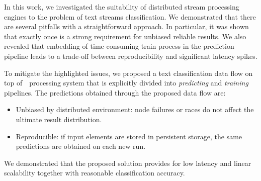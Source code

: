 \label {fs-short-conclusion}

In this work, we investigated the suitability of distributed stream processing engines to the problem of text streams classification. We demonstrated that there are several pitfalls with a straightforward approach. In particular, it was shown that exactly once is a strong requirement for unbiased reliable results. We also revealed that embedding of time-consuming train process in the prediction pipeline leads to a trade-off between reproducibility and significant latency spikes. 

To mitigate the highlighted issues, we proposed a text classification data flow on top of~\FlameStream\ processing system that is explicitly divided into {\em predicting} and {\em training} pipelines. The predictions obtained through the proposed data flow are:

\begin{itemize}
    \item Unbiased by distributed environment: node failures or races do not affect the ultimate result distribution.
    \item Reproducible: if input elements are stored in persistent storage, the same predictions are obtained on each new run.
\end{itemize}

We demonstrated that the proposed solution provides for low latency and linear scalability together with reasonable classification accuracy.